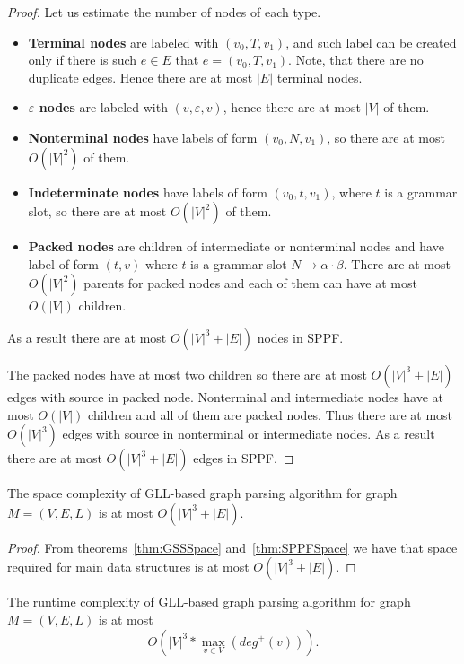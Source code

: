 \begin{proof}
Let us estimate the number of nodes of each type.
\begin{itemize}
\item \textbf{Terminal nodes} are labeled with $(v_0, T, v_1)$, and such label can be created only if there is such $e \in E$ that $e=(v_0, T,v_1)$. 
Note, that there are no duplicate edges. 
Hence there are at most $|E|$ terminal nodes.
\item \textbf{$\varepsilon$ nodes} are labeled with $(v,\varepsilon,v)$, hence there are at most $|V|$ of them. 
\item \textbf{Nonterminal nodes} have labels of form $(v_0, N, v_1)$, so there are at most $O(|V|^2)$ of them.
\item \textbf{Indeterminate nodes} have labels of form $(v_0, t, v_1)$, where $t$ is a grammar slot, so there are at most $O(|V|^2)$ of them.
\item \textbf{Packed nodes} are children of intermediate or nonterminal nodes and have label of form $(t, v)$ where $t$ is a grammar slot $N \rightarrow \alpha \cdot \beta$.
There are at most $O(|V|^2)$ parents for packed nodes and each of them can have at most $O(|V|)$ children.
\end{itemize}

As a result there are at most $O(|V|^3 + |E|)$ nodes in SPPF.

The packed nodes have at most two children so there are at most $O(|V|^3 + |E|)$ edges with source in packed node. 
Nonterminal and intermediate nodes have at most $O(|V|)$ children and all of them are packed nodes.
Thus there are at most $O(|V|^3)$ edges with source in nonterminal or intermediate nodes. As a result there are at most $O(|V|^3 + |E|)$ edges in SPPF.


\end{proof}

\begin{mytheorem}
The space complexity of GLL-based graph parsing algorithm for graph $M=(V,E,L)$ is at most $O(|V|^3 + |E|)$.
\end{mytheorem}

\begin{proof}

From theorems~\ref{thm:GSSSpace} and~\ref{thm:SPPFSpace} we have that space required for main data structures is at most $O(|V|^3 + |E|)$. 

\end{proof}


\begin{mytheorem}\label{thm:complexity}
The runtime complexity of GLL-based graph parsing algorithm for graph $M=(V,E,L)$ is at most $$O\left(|V|^3*\max\limits_{v \in V}\left(deg^+\left(v\right)\right)\right).$$
\end{mytheorem}

